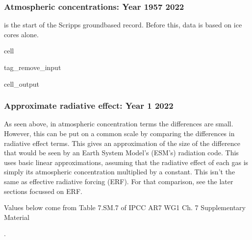 \documentclass[letterpaper,10pt,english]{jupyterBook}
\begin{document}
\subsubsection{Atmospheric concentrations: Year 1957 \sphinxhyphen{} 2022}
\label{\detokenize{user-guide-historical:atmospheric-concentrations-year-1957-2022}}
 is the start of the Scripps ground\sphinxhyphen{}based record.
Before this, data is based on ice cores alone.

\begin{sphinxuseclass}{cell}
\begin{sphinxuseclass}{tag_remove_input}\begin{sphinxVerbatimOutput}

\begin{sphinxuseclass}{cell_output}
\noindent{}

\end{sphinxuseclass}\end{sphinxVerbatimOutput}

\end{sphinxuseclass}
\end{sphinxuseclass}

\subsubsection{Approximate radiative effect: Year 1 \sphinxhyphen{} 2022}
\label{\detokenize{user-guide-historical:approximate-radiative-effect-year-1-2022}}
\sphinxAtStartPar
As seen above, in atmospheric concentration terms
the differences are small.
However, this can be put on a common scale
by comparing the differences in radiative effect terms.
This gives an approximation of the size of the difference
that would be seen by an Earth System Model’s (ESM’s) radiation code.
This uses basic linear approximations,
assuming that the radiative effect of each gas
is simply its atmospheric concentration multiplied by a constant.
This isn’t the same as effective radiative forcing (ERF).
For that comparison, see the later sections focussed on ERF.

\sphinxAtStartPar
Values below come from Table 7.SM.7 of
IPCC AR7 WG1 Ch. 7 Supplementary Material%
\begin{footnote}[4]\sphinxAtStartFootnote
{}
%
\end{footnote}.
\end{document}
